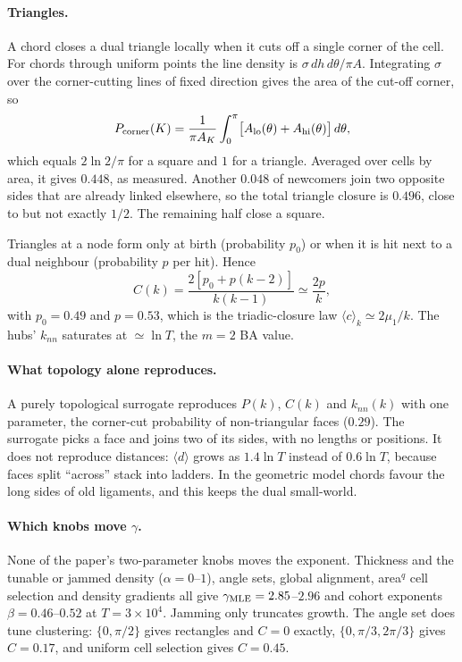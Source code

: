 \paragraph{Triangles.}
A chord closes a dual triangle locally when it cuts off a single corner of the
cell. For chords through uniform points the line density is
$\sigma\,dh\,d\theta/\pi A$. Integrating $\sigma$ over the corner-cutting lines
of fixed direction gives the area of the cut-off corner, so
\begin{equation}
  P_{\rm corner}(K)=\frac{1}{\pi A_K}\int_0^\pi\!\big[A_{\rm lo}(\theta)+A_{\rm hi}(\theta)\big]\,d\theta,
\end{equation}
which equals $2\ln2/\pi$ for a square and $1$ for a triangle. Averaged over
cells by area, it gives $0.448$, as measured. Another $0.048$ of newcomers join
two opposite sides that are already linked elsewhere, so the total triangle
closure is $0.496$, close to but not exactly $1/2$. The remaining half close a
square.

Triangles at a node form only at birth (probability $p_0$) or when it is hit
next to a dual neighbour (probability $p$ per hit). Hence
\begin{equation}
  C(k)=\frac{2[p_0+p(k-2)]}{k(k-1)}\simeq\frac{2p}{k},
\end{equation}
with $p_0=0.49$ and $p=0.53$, which is the triadic-closure law
$\langle c\rangle_k\simeq2\mu_1/k$. The hubs' $k_{nn}$ saturates at
$\simeq\ln T$, the $m=2$ BA value.

\paragraph{What topology alone reproduces.}
A purely topological surrogate reproduces $P(k)$, $C(k)$ and $k_{nn}(k)$ with
one parameter, the corner-cut probability of non-triangular faces ($0.29$).
The surrogate picks a face and joins two of its sides, with no lengths or
positions. It does not reproduce distances: $\langle d\rangle$ grows as
$1.4\ln T$ instead of $0.6\ln T$, because faces split ``across'' stack into
ladders. In the geometric model chords favour the long sides of old ligaments,
and this keeps the dual small-world.

\paragraph{Which knobs move $\gamma$.}
None of the paper's two-parameter knobs moves the exponent. Thickness and the
tunable or jammed density ($\alpha=0$--$1$), angle sets, global alignment,
area$^q$ cell selection and density gradients all give
$\gamma_{\rm MLE}=2.85$--$2.96$ and cohort exponents $\beta=0.46$--$0.52$ at
$T=3\times10^4$. Jamming only truncates growth. The angle set does tune
clustering: $\{0,\pi/2\}$ gives rectangles and $C=0$ exactly,
$\{0,\pi/3,2\pi/3\}$ gives $C=0.17$, and uniform cell selection gives $C=0.45$.

